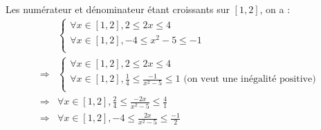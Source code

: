 \documentclass{report}
\begin{document}
Les numérateur et dénominateur étant croissants sur $[1,2]$, on a :
\begin{equation*}
	\begin{split}
		&\begin{cases}
			\forall x \in [1, 2], 2 \le 2x \le 4 \\
			\forall x \in [1, 2], -4 \le x^2-5 \le -1 \\
		\end{cases} \\
		\Rightarrow
		&\begin{cases}
			\forall x \in [1, 2], 2 \le 2x \le 4 \\
			\forall x \in [1, 2], \frac{1}{4} \le \frac{-1}{x^2-5} \le 1  \text{ (on veut une inégalité positive)}\\
		\end{cases} \\
		\Rightarrow
		& \forall x \in [1, 2], \frac{2}{4} \le \frac{-2x}{x^2-5} \le \frac{4}{1} \\
		\Rightarrow
		& \forall x \in [1, 2], -4 \le \frac{2x}{x^2-5} \le \frac{-1}{2} \\
	\end{split}
\end{equation*}
\end{document}
